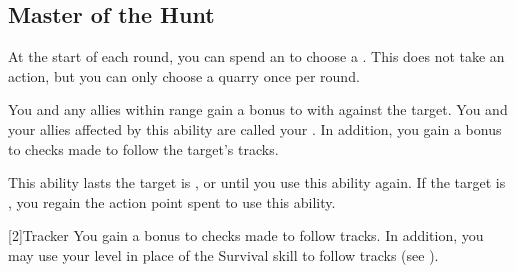     \subsection{Master of the Hunt}

        \label{Quarry}
        At the start of each round, you can spend an  to choose a .
        This does not take an action, but you can only choose a quarry once per round.
        \begin{ability}
            \begin{spelltargetinginfo}
            \end{spelltargetinginfo}
            \begin{spelleffects}
                \spelleffect You and any allies within range gain a  bonus to  with  against the target.
                You and your allies affected by this ability are called your .
                In addition, you gain a  bonus to checks made to follow the target's tracks.

                This ability lasts the target is , or until you use this ability again.
                If the target is , you regain the action point spent to use this ability.
            \end{spelleffects}
        \end{ability}

        [2]{Tracker}
        You gain a  bonus to checks made to follow tracks.
        In addition, you may use your level in place of the Survival skill to follow tracks (see ).

